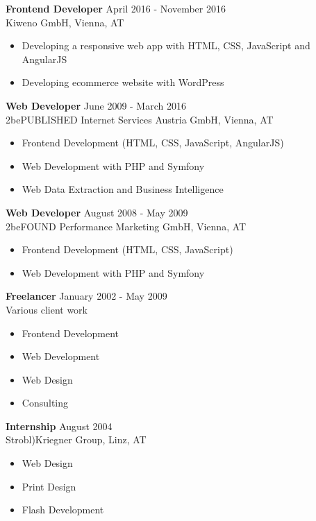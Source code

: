 \documentclass[margin]{res}
\begin{document}
\begin{resume}
\begin{itemize}
	\end{itemize}

\textbf{Frontend Developer} \hfill April 2016 - November 2016 \\
	Kiweno GmbH, Vienna, AT
	\begin{itemize} \itemsep -2pt
		\item Developing a responsive web app with HTML, CSS, JavaScript and AngularJS
		\item Developing ecommerce website with WordPress

	\end{itemize}

\textbf{Web Developer} \hfill June 2009 - March 2016 \\
	2bePUBLISHED Internet Services Austria GmbH, Vienna, AT
	\begin{itemize}  \itemsep -2pt
		\item Frontend Development (HTML, CSS, JavaScript, AngularJS)
		\item Web Development with PHP and Symfony
		\item Web Data Extraction and Business Intelligence
	\end{itemize}

\textbf{Web Developer} \hfill August 2008 - May 2009 \\
	2beFOUND Performance Marketing GmbH, Vienna, AT
	\begin{itemize}  \itemsep -2pt
		\item Frontend Development (HTML, CSS, JavaScript)
		\item Web Development with PHP and Symfony
	\end{itemize}

\textbf{Freelancer} \hfill January 2002 - May 2009 \\
	Various client work
	\begin{itemize}  \itemsep -2pt
		\item Frontend Development
		\item Web Development
		\item Web Design
		\item Consulting
	\end{itemize}

\textbf{Internship} \hfill August 2004 \\
	Strobl)Kriegner Group, Linz, AT
	\begin{itemize}  \itemsep -2pt
		\item Web Design
		\item Print Design
		\item Flash Development
	\end{itemize}


\end{resume}
\end{document}
